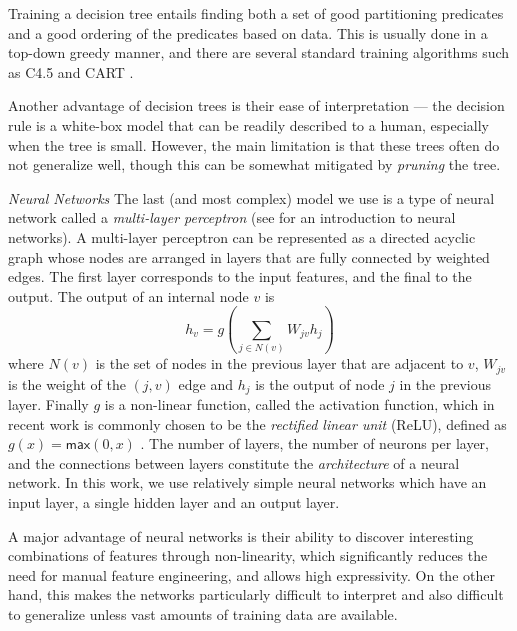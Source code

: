 \documentclass[conference]{IEEEtran}
\begin{document}
Training a decision tree entails finding both a set of good partitioning
predicates and a good ordering of the predicates based on data.
%
This is usually done in a top-down greedy manner, and there are several
standard training algorithms such as C4.5 \cite{Quinlan1993-de} and
CART \cite{Breiman1984-qy}.

Another advantage of decision trees is their ease of interpretation ---
the decision rule is a white-box model that can be readily described to
a human, especially when the tree is small.
%
However, the main limitation is that these trees often do not generalize
well, though this can be somewhat mitigated by \emph{pruning} the tree.

\emph{Neural Networks}
%
The last (and most complex) model we use is a type of neural network
called a \emph{multi-layer perceptron} (see \cite{Nielsen2015-pu} for
an introduction to neural networks).
%
A multi-layer perceptron can be represented as a directed acyclic
graph whose nodes are arranged in layers that are fully connected by
weighted edges.
%
The first layer corresponds to the input features, and the final to the
output.
%
The output of an internal node $v$ is
%
\[ h_v = g(\sum_{j \in N(v)} W_{jv} h_j ) \]
%
where $N(v)$ is the set of nodes in the previous layer that are adjacent
to $v$, $W_{jv}$ is the weight of the $(j, v)$ edge and $h_j$ is the
output of node $j$ in the previous layer.
%
Finally $g$ is a non-linear function, called the activation function,
which in recent work is commonly chosen to be the \emph{rectified linear
  unit} (ReLU), defined as $g(x) = \mathsf{max}(0,x)$
\cite{Nair2010-xg}.
%
The number of layers, the number of neurons per layer, and the
connections between layers constitute the \emph{architecture} of a
neural network.
%
In this work, we use relatively simple neural networks which have an
input layer, a single hidden layer and an output layer.

A major advantage of neural networks is their ability to discover
interesting combinations of features through non-linearity, which
significantly reduces the need for manual feature engineering, and
allows high expressivity.
%
On the other hand, this makes the networks particularly difficult to
interpret and also difficult to generalize unless vast amounts of
training data are available.
\end{document}
